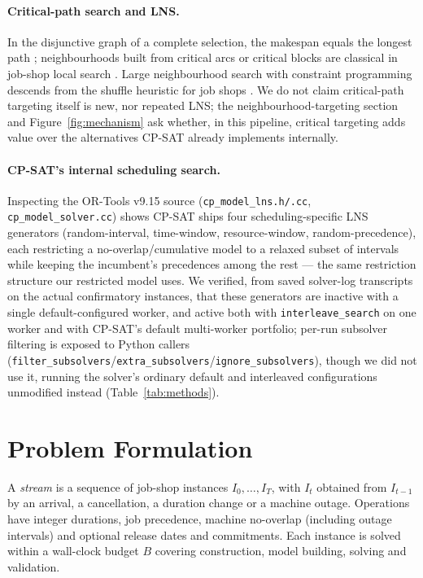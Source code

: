 \documentclass[letterpaper]{article} %
\begin{document}
\paragraph{Critical-path search and LNS.} In the disjunctive graph of a complete selection, the makespan equals the longest path \citep{balas1969}; neighbourhoods built from critical arcs or critical blocks are classical in job-shop local search \citep{vanlaarhoven1992,nowicki1996,balas1998}. Large neighbourhood search with constraint programming \citep{shaw1998,godard2005,pacino2011} descends from the shuffle heuristic for job shops \citep{applegate1991}. We do not claim critical-path targeting itself is new, nor repeated LNS; the neighbourhood-targeting section and Figure~\ref{fig:mechanism} ask whether, in this pipeline, critical targeting adds value over the alternatives CP-SAT already implements internally.

\paragraph{CP-SAT's internal scheduling search.} Inspecting the OR-Tools v9.15 source (\texttt{cp\_model\_lns.h/.cc}, \texttt{cp\_model\_solver.cc}) shows CP-SAT ships four scheduling-specific LNS generators (random-interval, time-window, resource-window, random-precedence), each restricting a no-overlap/cumulative model to a relaxed subset of intervals while keeping the incumbent's precedences among the rest --- the same restriction structure our restricted model uses. We verified, from saved solver-log transcripts on the actual confirmatory instances, that these generators are inactive with a single default-configured worker, and active both with \texttt{interleave\_search} on one worker and with CP-SAT's default multi-worker portfolio; per-run subsolver filtering is exposed to Python callers (\texttt{fil\-ter\_\-sub\-solvers}/\texttt{ex\-tra\_\-sub\-solvers}/\texttt{ig\-nore\_\-sub\-solvers}), though we did not use it, running the solver's ordinary default and interleaved configurations unmodified instead (Table~\ref{tab:methods}).

\section{Problem Formulation}
\label{sec:setting}

A \emph{stream} is a sequence of job-shop instances $I_0,\dots,I_T$, with $I_t$ obtained from $I_{t-1}$ by an arrival, a cancellation, a duration change or a machine outage. Operations have integer durations, job precedence, machine no-overlap (including outage intervals) and optional release dates and commitments. Each instance is solved within a wall-clock budget $B$ covering construction, model building, solving and validation.
\end{document}
